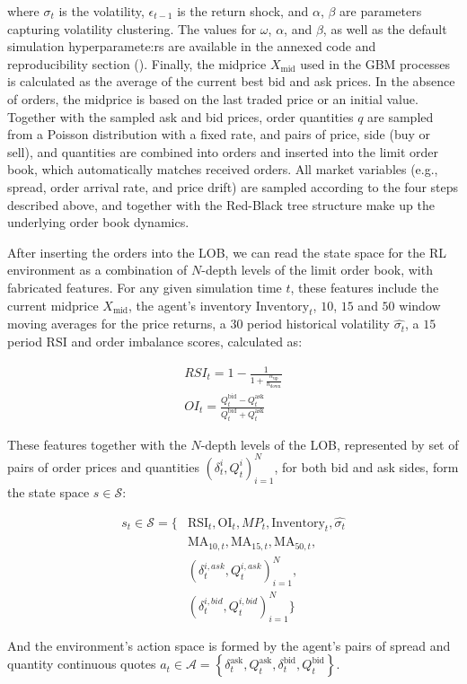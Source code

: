 \documentclass[11pt]{article}
\begin{document}
    where \( \sigma_t \) is the volatility, \( \epsilon_{t-1} \) is the return shock, and \( \alpha \), \( \beta \) are parameters capturing volatility clustering.
    The values for $\omega$, $\alpha$, and $\beta$, as well as the default simulation hyperparamete:rs are
    available in the annexed code and reproducibility section ().
    Finally, the midprice \( X_{\text{mid}} \) used in the GBM processes is calculated as the average of the current best bid and ask prices.
    In the absence of orders, the midprice is based on the last traded price or an initial value.
    Together with the sampled ask and bid prices, order quantities \( q \) are sampled from a Poisson distribution with a fixed rate,
    and pairs of price, side (buy or sell), and quantities are combined into orders and inserted into the limit order book,
    which automatically matches received orders.
    All market variables (e.g., spread, order arrival rate, and price drift) are sampled according to the four steps described above,
    and together with the Red-Black tree structure make up the underlying order book dynamics.

    After inserting the orders into the LOB, 
    we can read the state space for the RL environment as a combination of $N$-depth levels of the limit order book, with fabricated features.
    For any given simulation time $t$, these features include the current midprice $X_\text{mid}$, the agent's inventory $\text{Inventory}_t$, 
    $10$, $15$ and $50$ window moving averages for the price returns, a $30$ period historical volatility $\hat{\sigma_t}$,
    a $15$ period RSI and order imbalance scores, calculated as:

        \begin{align}
        \label{eq:rsi}
            RSI_t = 1 - \frac{1}{1 + \frac{n_\text{up}}{n_\text{down}}}\\
            OI_t = \frac{Q_t^{\text{bid}} - Q_t^{\text{ask}}}{Q_t^{\text{bid}} + Q_t^{\text{ask}}}
        \end{align}
    
    These features together with the $N$-depth levels of the LOB, 
    represented by set of pairs of order prices and quantities $(\delta_t^{i}, Q_t^{i})_{i=1}^{N}$, 
    for both bid and ask sides,
    form the state space $s\in \mathcal{S}$:

    \begin{equation}
        \begin{aligned}
            s_{t} \in \mathcal{S} = \big\{ &\text{RSI}_t, \text{OI}_t, MP_{t}, \text{Inventory}_t, \hat{\sigma_t}\\
            & \text{MA}_{10, t}, \text{MA}_{15, t}, \text{MA}_{50, t}, \\
            & (\delta_t^{i, ask}, Q_t^{i, ask})_{i=1}^{N}, \\
            & (\delta_t^{i, bid}, Q_t^{i, bid})_{i=1}^{N} \big\}
        \end{aligned}\label{eq:equation}
    \end{equation}

    And the environment's action space is formed by the agent's pairs of spread and quantity continuous quotes
    $a_t \in \mathcal{A} = \left\{ \delta_t^\text{ask}, Q_t^\text{ask},  \delta_t^\text{bid}, Q_t^\text{bid} \right\}$.
\end{document}
